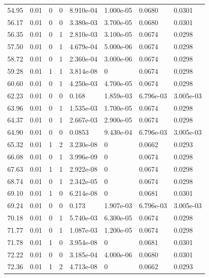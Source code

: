 \documentclass[preview]{standalone}
\begin{document}
{{{\begin{tabular}{L{1.2cm}C{1.2cm} C{0.3cm}C{0.5cm} C{1.4cm}C{1.4cm} C{1.4cm}C{1.4cm}}
  54.95  &  0.01  & 0     &  0 &  8.910e-04  & 1.000e-05  & 0.0680 &  0.0301   \\ 
  56.17  &  0.01  & 0     &  0 &  3.380e-03  & 3.700e-05  & 0.0680 &  0.0301   \\ 
  56.35  &  0.01  & 0     &  1 &  2.810e-03  & 3.100e-05  & 0.0674 &  0.0298   \\ 
  57.50  &  0.01  & 0     &  1 &  4.679e-04  & 5.000e-06  & 0.0674 &  0.0298   \\ 
  58.72  &  0.01  & 0     &  1 &  2.360e-04  & 3.000e-06  & 0.0674 &  0.0298   \\ 
  59.28  &  0.01  & 1     &  1 &  3.814e-08  & 0  & 0.0674 &  0.0298   \\ 
  60.60  &  0.01  & 0     &  1 &  4.250e-03  & 4.700e-05  & 0.0674 &  0.0298   \\ 
  62.23  &  0.01  & 0     &  0 &  0.168  & 1.859e-03  & 6.796e-03 &  3.005e-03   \\ 
  63.96  &  0.01  & 0     &  1 &  1.535e-03  & 1.700e-05  & 0.0674 &  0.0298   \\ 
  64.37  &  0.01  & 0     &  1 &  2.667e-03  & 2.900e-05  & 0.0674 &  0.0298   \\ 
  64.90  &  0.01  & 0     &  0 &  0.0853  & 9.430e-04  & 6.796e-03 &  3.005e-03   \\ 
  65.32  &  0.01  & 1     &  2 &  3.230e-08  & 0  & 0.0662 &  0.0293   \\ 
  66.08  &  0.01  & 0     &  1 &  3.996e-09  & 0  & 0.0674 &  0.0298   \\ 
  67.63  &  0.01  & 1     &  1 &  2.922e-08  & 0  & 0.0674 &  0.0298   \\ 
  68.74  &  0.01  & 0     &  1 &  2.342e-05  & 0  & 0.0674 &  0.0298   \\ 
  69.10  &  0.01  & 1     &  0 &  6.214e-08  & 0  & 0.0681 &  0.0301   \\ 
  69.24  &  0.01  & 0     &  0 &  0.173  & 1.907e-03  & 6.796e-03 &  3.005e-03   \\ 
  70.18  &  0.01  & 0     &  1 &  5.740e-03  & 6.300e-05  & 0.0674 &  0.0298   \\ 
  71.77  &  0.01  & 0     &  1 &  1.087e-03  & 1.200e-05  & 0.0674 &  0.0298   \\ 
  71.78  &  0.01  & 1     &  0 &  3.954e-08  & 0  & 0.0681 &  0.0301   \\ 
  72.22  &  0.01  & 0     &  0 &  3.185e-04  & 4.000e-06  & 0.0680 &  0.0301   \\ 
  72.36  &  0.01  & 1     &  2 &  4.713e-08  & 0  & 0.0662 &  0.0293   \\ 

\end{tabular}}}}
\end{document}
